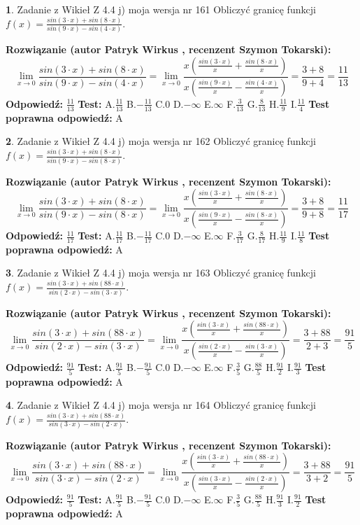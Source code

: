 \documentclass[12pt, a4paper]{article}
\theoremstyle{definition} %
\newtheorem{zad}{}
\newcommand{\zadStart}[1]{\begin{zad}#1\newline}
\newcommand{\zadStop}{\end{zad}}
\newcommand{\rozwStart}[2]{\noindent \textbf{Rozwiązanie (autor #1 , recenzent #2): }\newline}
\newcommand{\rozwStop}{\newline}
\newcommand{\odpStart}{\noindent \textbf{Odpowiedź:}\newline}
\newcommand{\odpStop}{\newline}
\newcommand{\testStart}{\noindent \textbf{Test:}\newline}
\newcommand{\testStop}{\newline}
\newcommand{\kluczStart}{\noindent \textbf{Test poprawna odpowiedź:}\newline}
\newcommand{\kluczStop}{\newline}
\begin{document}
\zadStart{Zadanie z Wikieł Z 4.4 j) moja wersja nr 161}
Obliczyć granicę funkcji $f(x)=\frac{sin(3\cdot x) +sin(8\cdot x)}{sin(9\cdot x) -sin(4\cdot x)}$.
\zadStop
\rozwStart{Patryk Wirkus}{Szymon Tokarski}
$$\lim\limits_{x\to 0}\frac{sin(3\cdot x) +sin(8\cdot x)}{sin(9\cdot x) -sin(4\cdot x)}=\lim\limits_{x\to 0}\frac{x(\frac{sin(3\cdot x)}{x}+\frac{sin(8\cdot x)}{x})}{x(\frac{sin(9\cdot x)}{x}-\frac{sin(4\cdot x)}{x})}=\frac{3+8}{9+4} = \frac{11}{13}$$
\rozwStop
\odpStart
$\frac{11}{13}$
\odpStop
\testStart
A.$\frac{11}{13}$
B.$-\frac{11}{13}$
C.$0$
D.$-\infty$
E.$\infty$
F.$\frac{3}{13}$
G.$\frac{8}{13}$
H.$\frac{11}{9}$
I.$\frac{11}{4}$
\testStop
\kluczStart
A
\kluczStop



\zadStart{Zadanie z Wikieł Z 4.4 j) moja wersja nr 162}
Obliczyć granicę funkcji $f(x)=\frac{sin(3\cdot x) +sin(8\cdot x)}{sin(9\cdot x) -sin(8\cdot x)}$.
\zadStop
\rozwStart{Patryk Wirkus}{Szymon Tokarski}
$$\lim\limits_{x\to 0}\frac{sin(3\cdot x) +sin(8\cdot x)}{sin(9\cdot x) -sin(8\cdot x)}=\lim\limits_{x\to 0}\frac{x(\frac{sin(3\cdot x)}{x}+\frac{sin(8\cdot x)}{x})}{x(\frac{sin(9\cdot x)}{x}-\frac{sin(8\cdot x)}{x})}=\frac{3+8}{9+8} = \frac{11}{17}$$
\rozwStop
\odpStart
$\frac{11}{17}$
\odpStop
\testStart
A.$\frac{11}{17}$
B.$-\frac{11}{17}$
C.$0$
D.$-\infty$
E.$\infty$
F.$\frac{3}{17}$
G.$\frac{8}{17}$
H.$\frac{11}{9}$
I.$\frac{11}{8}$
\testStop
\kluczStart
A
\kluczStop



\zadStart{Zadanie z Wikieł Z 4.4 j) moja wersja nr 163}
Obliczyć granicę funkcji $f(x)=\frac{sin(3\cdot x) +sin(88\cdot x)}{sin(2\cdot x) -sin(3\cdot x)}$.
\zadStop
\rozwStart{Patryk Wirkus}{Szymon Tokarski}
$$\lim\limits_{x\to 0}\frac{sin(3\cdot x) +sin(88\cdot x)}{sin(2\cdot x) -sin(3\cdot x)}=\lim\limits_{x\to 0}\frac{x(\frac{sin(3\cdot x)}{x}+\frac{sin(88\cdot x)}{x})}{x(\frac{sin(2\cdot x)}{x}-\frac{sin(3\cdot x)}{x})}=\frac{3+88}{2+3} = \frac{91}{5}$$
\rozwStop
\odpStart
$\frac{91}{5}$
\odpStop
\testStart
A.$\frac{91}{5}$
B.$-\frac{91}{5}$
C.$0$
D.$-\infty$
E.$\infty$
F.$\frac{3}{5}$
G.$\frac{88}{5}$
H.$\frac{91}{2}$
I.$\frac{91}{3}$
\testStop
\kluczStart
A
\kluczStop



\zadStart{Zadanie z Wikieł Z 4.4 j) moja wersja nr 164}
Obliczyć granicę funkcji $f(x)=\frac{sin(3\cdot x) +sin(88\cdot x)}{sin(3\cdot x) -sin(2\cdot x)}$.
\zadStop
\rozwStart{Patryk Wirkus}{Szymon Tokarski}
$$\lim\limits_{x\to 0}\frac{sin(3\cdot x) +sin(88\cdot x)}{sin(3\cdot x) -sin(2\cdot x)}=\lim\limits_{x\to 0}\frac{x(\frac{sin(3\cdot x)}{x}+\frac{sin(88\cdot x)}{x})}{x(\frac{sin(3\cdot x)}{x}-\frac{sin(2\cdot x)}{x})}=\frac{3+88}{3+2} = \frac{91}{5}$$
\rozwStop
\odpStart
$\frac{91}{5}$
\odpStop
\testStart
A.$\frac{91}{5}$
B.$-\frac{91}{5}$
C.$0$
D.$-\infty$
E.$\infty$
F.$\frac{3}{5}$
G.$\frac{88}{5}$
H.$\frac{91}{3}$
I.$\frac{91}{2}$
\testStop
\kluczStart
A
\kluczStop
\end{document}
